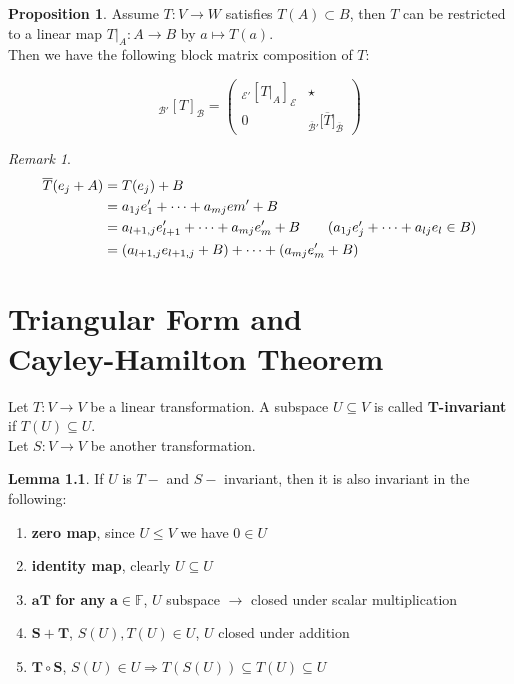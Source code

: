 \documentclass[11pt, a4paper]{report}
\numberwithin{equation}{section}
\newcommand{\F}{\mathbb{F}}
\newcommand{\pmx}[1]{\begin{pmatrix}#1\end{pmatrix}}
\numberwithin{equation}{subsection}
\theoremstyle{plain}
\theoremstyle{definition}
\newtheorem{lem}[thm]{Lemma}
\newtheorem{prop}[thm]{Proposition}
\theoremstyle{remark}
\newtheorem*{rem}{Remark}
\begin{document}
\begin{prop} Assume $T: V \to W$ satisfies $T(A) \subset B$, then $T$ can be restricted to a linear map $T|_A : A \to B$ by $a \mapsto T(a)$.\\
Then we have the following block matrix composition of $T$:

$$_\mathcal{B'}[T]_\mathcal{B} = \pmx{_\mathcal{E'}[T|_A]_\mathcal{E} & \star \\ 0 & _{\overline{\mathcal{B}}'}\big[\overline{T}\big]_{\overline{\mathcal{B}}}}$$

\begin{rem} 
\begin{align*}
\overline{T} (e_j + A) 	&= T(e_j) + B\\
							&= a_{1j}e_1' + \cdots + a_{mj}em' + B\\
							&= a_{l+1,j}e_{l+1}' + \cdots + a_{mj}e_m' + B \tag{$a_{1j}e_j' + \cdots + a_{lj}e_l \in B$}\\
							&= (a_{l+1,j}e_{l+1,j} + B) + \cdots + (a_{mj}e_m' + B)
\end{align*}
\end{rem}
\end{prop}

\chapter[Triangular Form and Cayley-Hamilton Theorem]{Triangular Form and\\ Cayley-Hamilton Theorem}
Let $T: V \to V$ be a linear transformation. A subspace $U \subseteq V$ is called \textbf{T-invariant} if $T(U) \subseteq U$.\\
Let $S: V \to V$ be another transformation.

\begin{lem} If $U$ is $T-$ and $S-$ invariant, then it is also invariant in the following:
\begin{enumerate}[(1) ]
\item \textbf{zero map}, since $U \leq V$ we have $0 \in U$
\item \textbf{identity map}, clearly $U \subseteq U$
\item $\boldsymbol{aT}$ \textbf{for any} $\boldsymbol{a \in \F}$, $U$ subspace $\rightarrow$ closed under scalar multiplication
\item $\boldsymbol{S + T}$, $S(U), T(U) \in U$, $U$ closed under addition
\item $\boldsymbol{T \circ S}$, $S(U) \in U \Rightarrow T(S(U)) \subseteq T(U) \subseteq U$
\end{enumerate} \end{lem}
\end{document}

